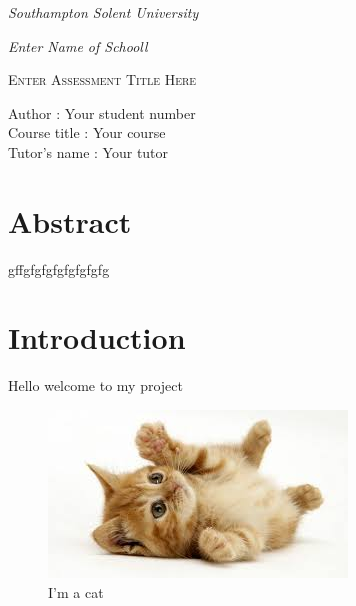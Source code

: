 \documentclass[12pt,a4paper]{article}
\begin{document}
\begin{titlepage}
{\fontsize{14}{12} \emph{Southampton Solent University}\par}
{\fontsize{14}{12}  \emph{Enter Name of Schooll} \par}


	\centering
	\vspace{10 cm}
	{\scshape\Huge Enter Assessment Title Here\par}
	\vspace{10cm}	
\begin{flushleft}

Author	\hspace{1.12cm} 	         : Your student number   \\
Course title	\hspace{0.2cm} 	: Your course  \\
Tutor's name	\hspace{0.00cm}       : Your tutor   \\

\end{flushleft}
 
\end{titlepage}

\tableofcontents

\clearpage

\listoffigures

\clearpage


\section{Abstract}
gffgfgfgfgfgfgfgfg
\section{Introduction}

Hello welcome to my project 

\begin{figure}[h!]
	\centering
	\includegraphics{assets/cat.jpeg}
	 \caption{I'm a cat}
	 \label{fig:cat}
\end{figure}
\end{document}
